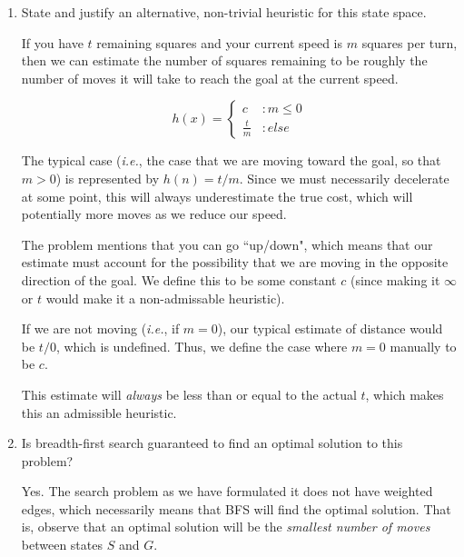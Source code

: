 \documentclass[12pt]{article}
\begin{document}
\begin{enumerate}
\item State and justify an alternative, non-trivial heuristic for this state space.
\begin{solution}
If you have $t$ remaining squares and your current speed is $m$ squares per turn, then we can estimate the number of squares remaining to be roughly the number of moves it will take to reach the goal at the current speed.

\begin{displaymath}
   h(x) = \left\{
     \begin{array}{cl}
       c & : m \le 0 \\
       \frac{t}{m} & : else
     \end{array}
   \right.
\end{displaymath}

The typical case (\textit{i.e.}, the case that we are moving toward the goal, so that $m > 0$) is represented by $h(n) = t / m$. Since we must necessarily decelerate at some point, this will always underestimate the true cost, which will potentially more moves as we reduce our speed.
\newline

The problem mentions that you can go ``up/down", which means that our estimate must account for the possibility that we are moving in the opposite direction of the goal. We define this to be some constant $c$ (since making it $\infty$ or $t$ would make it a non-admissable heuristic).
\newline

If we are not moving (\textit{i.e.}, if $m = 0$), our typical estimate of distance would be $t / 0$, which is undefined. Thus, we define the case where $m = 0$ manually to be $c$.
\newline

This estimate will \textit{always} be less than or equal to the actual $t$, which makes this an admissible heuristic.
\end{solution}

\item Is breadth-first search guaranteed to find an optimal solution to this problem?
\begin{solution}
Yes. The search problem as we have formulated it does not have weighted edges, which necessarily means that BFS will find the optimal solution. That is, observe that an optimal solution will be the \textit{smallest number of moves} between states $S$ and $G$.
\newline
\end{solution}


\end{enumerate}
\end{document}
